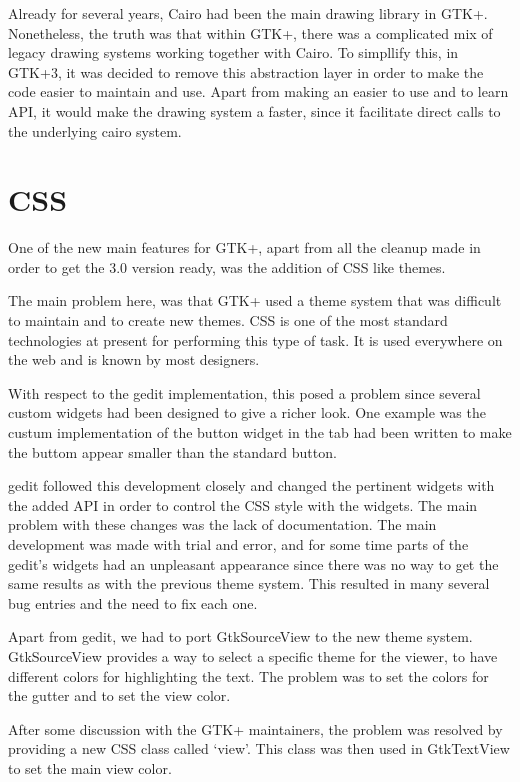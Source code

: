 Already for several years, Cairo had been the main drawing library in GTK+.  Nonetheless, the truth was that 
within GTK+, there was a complicated mix of legacy drawing systems working together with Cairo. 
To simpllify this, in GTK+3, it was decided to remove this abstraction layer in order 
to make the code easier to maintain and use.  Apart from making an easier to use and to learn API, 
it would make the drawing system a faster, since it facilitate direct calls to the underlying cairo system.

\section{CSS}

One of the new main features for GTK+, apart from all the cleanup made in order to get the 3.0 version ready, was the 
addition of CSS like themes.

The main problem here, was that GTK+ used a theme system that was difficult to maintain and to create new themes. CSS is one of the 
most standard technologies at present for performing this type of task. It is used everywhere on the web and is known by most designers. 

With respect to the gedit implementation, this posed a problem since several custom widgets had been designed to give a 
richer look.  One example was the custum implementation of the button widget in the tab had been written to make the buttom appear 
smaller than the standard button.

gedit followed this development closely and changed the pertinent widgets with the added API in order to control the 
CSS style with the widgets. The main problem with these changes was the lack of documentation. The main development was made with trial 
and error,  and for some time parts of the gedit's widgets had an unpleasant appearance since there was no way to get the same results 
as with the previous theme system. This resulted in many several bug entries and the need to fix each one.

Apart from gedit, we had to port GtkSourceView to the new theme system. GtkSourceView provides a way to select a specific theme for the viewer, to have different colors for highlighting the text. The problem  was to set the colors for the gutter and to set the view color.

After some discussion with the GTK+ maintainers, the problem was resolved by providing a new CSS class called `view'. 
This class was then used in GtkTextView to set the main view color.

